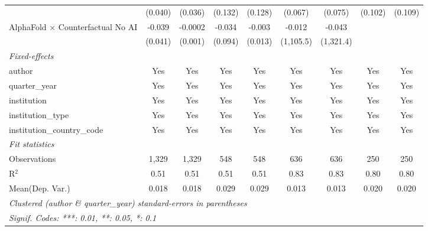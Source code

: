 \begin{tabular}{lcccccccc}
                                            & (0.040) & (0.036) & (0.132) & (0.128) & (0.067)   & (0.075)   & (0.102) & (0.109)\\   
   AlphaFold $\times$ Counterfactual No AI  & -0.039  & -0.0002 & -0.034  & -0.003  & -0.012    & -0.043    &         &   \\   
                                            & (0.041) & (0.001) & (0.094) & (0.013) & (1,105.5) & (1,321.4) &         &   \\   
   \midrule
   \emph{Fixed-effects}\\
   author                                   & Yes     & Yes     & Yes     & Yes     & Yes       & Yes       & Yes     & Yes\\  
   quarter\_year                            & Yes     & Yes     & Yes     & Yes     & Yes       & Yes       & Yes     & Yes\\  
   institution                              & Yes     & Yes     & Yes     & Yes     & Yes       & Yes       & Yes     & Yes\\  
   institution\_type                        & Yes     & Yes     & Yes     & Yes     & Yes       & Yes       & Yes     & Yes\\  
   institution\_country\_code               & Yes     & Yes     & Yes     & Yes     & Yes       & Yes       & Yes     & Yes\\  
   \midrule
   \emph{Fit statistics}\\
   Observations                             & 1,329   & 1,329   & 548     & 548     & 636       & 636       & 250     & 250\\  
   R$^2$                                    & 0.51    & 0.51    & 0.51    & 0.51    & 0.83      & 0.83      & 0.80    & 0.80\\  
Mean(Dep. Var.) & 0.018 & 0.018 & 0.029 & 0.029 & 0.013 & 0.013 & 0.020 & 0.020 \\
   \midrule \midrule
   \multicolumn{9}{l}{\emph{Clustered (author \& quarter\_year) standard-errors in parentheses}}\\
   \multicolumn{9}{l}{\emph{Signif. Codes: ***: 0.01, **: 0.05, *: 0.1}}\\
\end{tabular}
\par\endgroup
